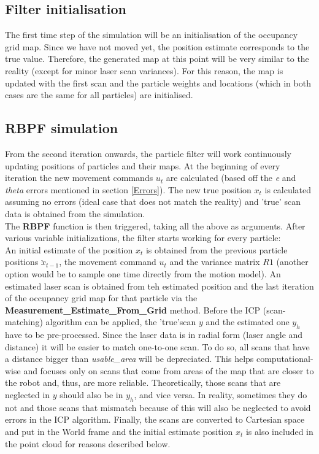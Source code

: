 \subsection{Filter initialisation}
The first time step of the simulation will be an initialisation of the occupancy grid map. Since we have not moved yet, the position estimate corresponds to the true value. Therefore, the generated map at this point will be very similar to the reality (except for minor laser scan variances). For this reason, the map is updated with the first scan and the particle weights and locations (which in both cases are the same for all particles) are initialised.

\subsection{RBPF simulation}
From the second iteration onwards, the particle filter will work continuously updating positions of particles and their maps. At the beginning of every iteration the new movement commands $u_t$ are calculated (based off the \textit{e} and \textit{theta} errors mentioned in section \ref{Errors}). The new true position $x_t$ is calculated assuming no errors (ideal case that does not match the reality) and 'true' scan data is obtained from the simulation.\\
The \textbf{RBPF} function is then triggered, taking all the above as arguments. After various variable initializations, the filter starts working for every particle:\\
An initial estimate of the position $x_t$ is obtained from the previous particle positions $\ddot x_{t-1}$, the movement command $u_t$ and the variance matrix $R1$ (another option would be to sample one time directly from the motion model). An estimated laser scan is obtained from teh estimated position and the last iteration of the occupancy grid map for that particle via the \textbf{Measurement\_Estimate\_From\_Grid} method. Before the ICP (scan-matching) algorithm can be applied, the 'true'scan $y$ and the estimated one $y_h$ have to be pre-processed. Since the laser data is in radial form (laser angle and distance) it will be easier to match one-to-one scan. To do so, all scans that have a distance bigger than \textit{usable\_area} will be depreciated. This helps computational-wise and focuses only on scans that come from areas of the map that are closer to the robot and, thus, are more reliable. Theoretically, those scans that are neglected in $y$ should also be in $y_h$, and vice versa. In reality, sometimes they do not and those scans that mismatch because of this will also be neglected to avoid errors in the ICP algorithm. Finally, the scans are converted to Cartesian space and put in the World frame and the initial estimate position $x_t$ is also included in the point cloud for reasons described below.\\
